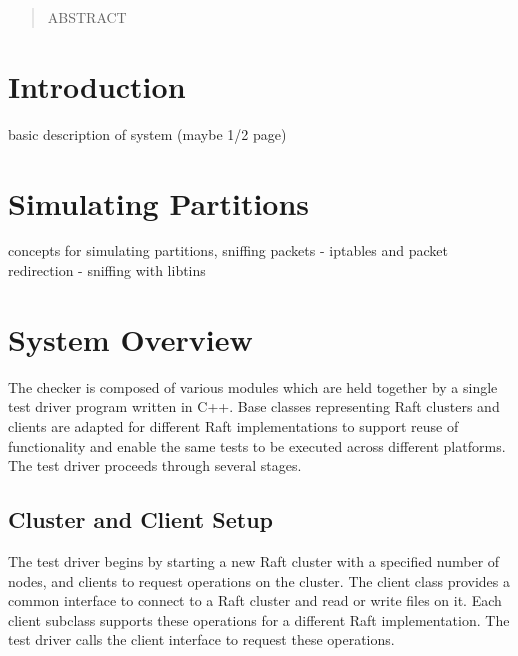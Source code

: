 \documentclass[UTF8]{article}
\begin{document}
 

\setlength\parindent{24pt}

\begin{abstract}
	
ABSTRACT

\end{abstract} 

\section{Introduction}

basic description of system (maybe 1/2 page)

\section{Simulating Partitions}

concepts for simulating partitions, sniffing packets
- iptables and packet redirection
- sniffing with libtins

\section{System Overview}

The checker is composed of various modules which are held together by a single test driver program written in C++. Base classes representing Raft clusters and clients are adapted for different Raft implementations to support reuse of functionality and enable the same tests to be executed across different platforms. The test driver proceeds through several stages.

\subsection{Cluster and Client Setup}

The test driver begins by starting a new Raft cluster with a specified number of nodes, and clients to request operations on the cluster. The client class provides a common interface to connect to a Raft cluster and read or write files on it. Each client subclass supports these operations for a different Raft implementation. The test driver calls the client interface to request these operations.
\end{document}

